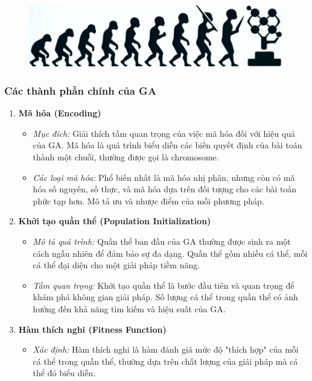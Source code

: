 \documentclass[14pt]{article}
\begin{document}
	\begin{figure}[h]
		\centering
		\includegraphics[width=\textwidth]{./Image/IconGACover.png}
		\label{fig:mylabel}
	\end{figure}

	\subsubsection{Các thành phần chính của GA}
	\begin{enumerate}
		\item \textbf{Mã hóa (Encoding)}
		\begin{itemize}
			\item \textit{Mục đích:} Giải thích tầm quan trọng của việc mã hóa đối với hiệu quả của GA. Mã hóa là quá trình biểu diễn các biến quyết định của bài toán thành một chuỗi, thường được gọi là chromosome.
			\item \textit{Các loại mã hóa:} Phổ biến nhất là mã hóa nhị phân, nhưng còn có mã hóa số nguyên, số thực, và mã hóa dựa trên đối tượng cho các bài toán phức tạp hơn. Mô tả ưu và nhược điểm của mỗi phương pháp.
		\end{itemize}
		\item \textbf{Khởi tạo quần thể (Population Initialization)}
		\begin{itemize}
			\item \textit{Mô tả quá trình:} Quần thể ban đầu của GA thường được sinh ra một cách ngẫu nhiên để đảm bảo sự đa dạng. Quần thể gồm nhiều cá thể, mỗi cá thể đại diện cho một giải pháp tiềm năng.
			\item \textit{Tầm quan trọng:} Khởi tạo quần thể là bước đầu tiên và quan trọng để khám phá không gian giải pháp. Số lượng cá thể trong quần thể có ảnh hưởng đến khả năng tìm kiếm và hiệu suất của GA.
		\end{itemize}
		\item \textbf{Hàm thích nghi (Fitness Function)}
		\begin{itemize}
			\item \textit{Xác định:} Hàm thích nghi là hàm đánh giá mức độ "thích hợp" của mỗi cá thể trong quần thể, thường dựa trên chất lượng của giải pháp mà cá thể đó biểu diễn.

\end{itemize}
\end{enumerate}
\end{document}
